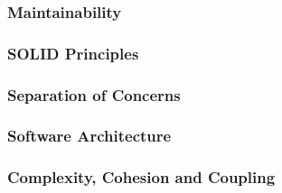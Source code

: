 \subsubsection{Maintainability}
\label{section:2.2.1}


\subsubsection{SOLID Principles}


\subsubsection{Separation of Concerns}


\subsubsection{Software Architecture}


\subsubsection{Complexity, Cohesion and Coupling}
